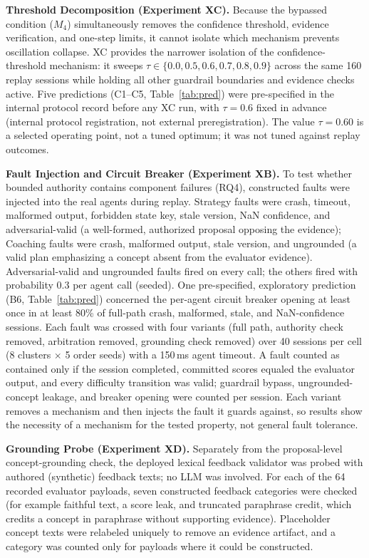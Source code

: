 \documentclass[runningheads,a4paper]{llncs}
\begin{document}
\textbf{Threshold Decomposition (Experiment XC).} Because the bypassed condition ($M_4$) simultaneously removes the confidence threshold, evidence verification, and one-step limits, it cannot isolate which mechanism prevents oscillation collapse. XC provides the narrower isolation of the confidence-threshold mechanism: it sweeps $\tau\in\{0.0,0.5,0.6,0.7,0.8,0.9\}$ across the same 160 replay sessions while holding all other guardrail boundaries and evidence checks active. Five predictions (C1--C5, Table~\ref{tab:pred}) were pre-specified in the internal protocol record before any XC run, with $\tau=0.6$ fixed in advance (internal protocol registration, not external preregistration). The value $\tau=0.60$ is a selected operating point, not a tuned optimum; it was not tuned against replay outcomes.

\textbf{Fault Injection and Circuit Breaker (Experiment XB).} To test whether bounded authority contains component failures (RQ4), constructed faults were injected into the real agents during replay. Strategy faults were crash, timeout, malformed output, forbidden state key, stale version, NaN confidence, and adversarial-valid (a well-formed, authorized proposal opposing the evidence); Coaching faults were crash, malformed output, stale version, and ungrounded (a valid plan emphasizing a concept absent from the evaluator evidence). Adversarial-valid and ungrounded faults fired on every call; the others fired with probability 0.3 per agent call (seeded). One pre-specified, exploratory prediction (B6, Table~\ref{tab:pred}) concerned the per-agent circuit breaker opening at least once in at least 80\% of full-path crash, malformed, stale, and NaN-confidence sessions. Each fault was crossed with four variants (full path, authority check removed, arbitration removed, grounding check removed) over 40 sessions per cell (8 clusters $\times$ 5 order seeds) with a 150\,ms agent timeout. A fault counted as contained only if the session completed, committed scores equaled the evaluator output, and every difficulty transition was valid; guardrail bypass, ungrounded-concept leakage, and breaker opening were counted per session. Each variant removes a mechanism and then injects the fault it guards against, so results show the necessity of a mechanism for the tested property, not general fault tolerance.

\textbf{Grounding Probe (Experiment XD).} Separately from the proposal-level concept-grounding check, the deployed lexical feedback validator was probed with authored (synthetic) feedback texts; no LLM was involved. For each of the 64 recorded evaluator payloads, seven constructed feedback categories were checked (for example faithful text, a score leak, and truncated paraphrase credit, which credits a concept in paraphrase without supporting evidence). Placeholder concept texts were relabeled uniquely to remove an evidence artifact, and a category was counted only for payloads where it could be constructed.
\end{document}
